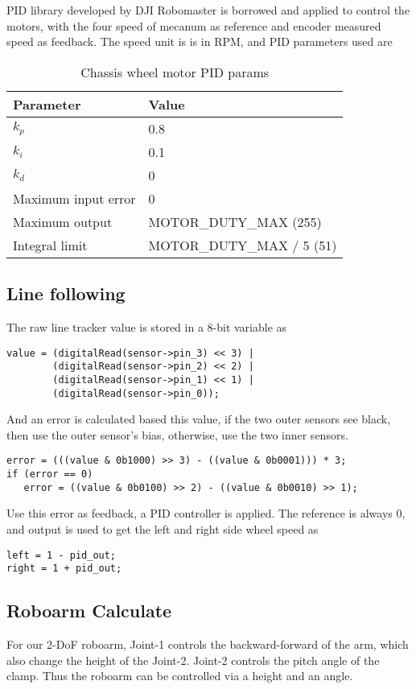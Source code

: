 PID library developed by DJI Robomaster is borrowed 
and applied to control the motors, with the four speed of mecanum as reference
and encoder measured speed as feedback. The speed unit is is in RPM, and PID parameters used are
\begin{table}[H]
    \centering
    \begin{tabular}{|p{2in}|p{2in}|}
       \hline 
       Parameter  & Value  \\ \hline 
       $k_p$  & 0.8 \\ \hline 
       $k_i$ & 0.1 \\ \hline 
       $k_d$ & 0 \\ \hline 
       Maximum input error & 0 \\ \hline 
       Maximum output & MOTOR\_DUTY\_MAX (255) \\ \hline 
       Integral limit & MOTOR\_DUTY\_MAX / 5 (51) \\ \hline
    \end{tabular}
    \caption{Chassis wheel motor PID params}
    \label{tab:chassis_pid_params}
\end{table}

\subsection{Line following}
The raw line tracker value is stored in a 8-bit variable as
\begin{lstlisting}
value = (digitalRead(sensor->pin_3) << 3) |
        (digitalRead(sensor->pin_2) << 2) |
        (digitalRead(sensor->pin_1) << 1) |
        (digitalRead(sensor->pin_0));
\end{lstlisting}

And an error is calculated based this value, if the two outer sensors see black, 
then use the outer sensor's bias, otherwise, use the two inner sensors.  
\begin{lstlisting}
error = (((value & 0b1000) >> 3) - ((value & 0b0001))) * 3;
if (error == 0)
   error = ((value & 0b0100) >> 2) - ((value & 0b0010) >> 1);
\end{lstlisting}

Use this error as feedback, a PID controller is applied. The reference is always 0, and output is used to get the left and right side wheel speed as 
\begin{lstlisting}
left = 1 - pid_out;
right = 1 + pid_out;
\end{lstlisting}

\subsection{Roboarm Calculate}
For our 2-DoF roboarm, Joint-1 controls the backward-forward of the arm, which also change the height of the Joint-2. Joint-2 controls the pitch angle of the clamp. Thus the roboarm can be controlled via a height and an angle.

